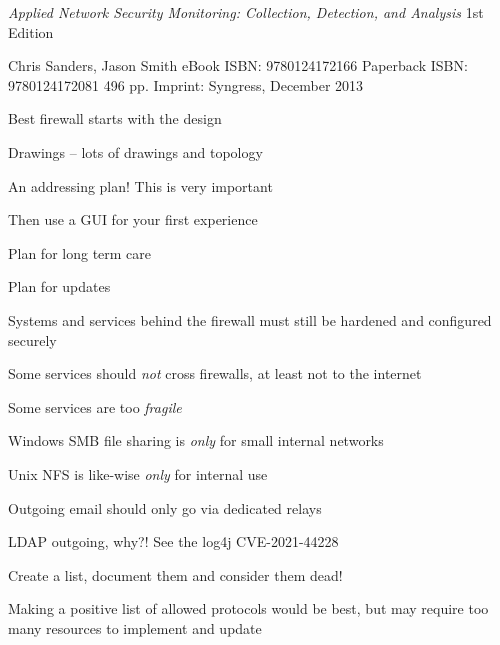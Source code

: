 \documentclass[Screen16to9,17pt]{foils}
\begin{document}


\emph{Applied Network Security Monitoring: Collection, Detection, and Analysis}
1st Edition

Chris Sanders, Jason Smith
eBook ISBN: 9780124172166
Paperback ISBN: 9780124172081 496 pp.
Imprint: Syngress, December 2013




Best firewall starts with the design
\begin{list2}
\item Drawings -- lots of drawings and topology
\item An addressing plan! This is very important
\item Then use a GUI for your first experience
\item Plan for long term care
\item Plan for updates
\item Systems and services behind the firewall must still be hardened and configured securely
\end{list2}


\begin{list1}
\item Some services should \emph{not} cross firewalls, at least not to the internet
\item Some services are too \emph{fragile}

\begin{list2}
\item Windows SMB file sharing is \emph{only} for small internal networks
\item Unix NFS is like-wise \emph{only} for internal use
\item Outgoing email should only go via dedicated relays
\item LDAP outgoing, why?! See the log4j CVE-2021-44228
\item Create a list, document them and consider them dead!
\end{list2}
\item Making a positive list of allowed protocols would be best, but may require too many resources to implement and update
\end{list1}


\end{document}
